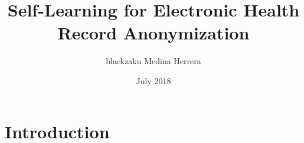 \documentclass{article}
\title{Self-Learning for Electronic Health Record Anonymization}
\author{blackzaku Medina Herrera}
\date{July 2018}
\begin{document}
\maketitle

\section{Introduction}
\end{document}
